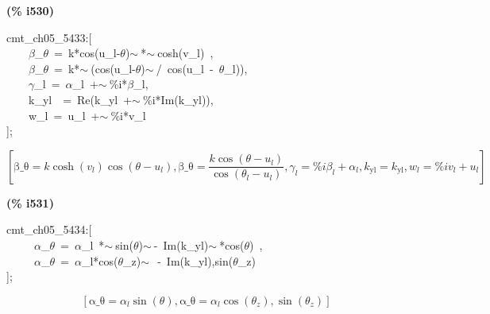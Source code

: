\documentclass[fleqn]{article}
\begin{document}
\noindent
\begin{minipage}[t]{4.000000em}\color{red}\bfseries
(\% i530)	
\end{minipage}
\begin{minipage}[t]{\textwidth}\color{blue}
cmt\_ch05\_5433:[\\
\ \ \ \ \ensuremath{\beta}\_\ensuremath{\theta}\ =\ k*cos(u\_l-\ensuremath{\theta})\ensuremath{\sim\ }*\ensuremath{\sim\ }cosh(v\_l)\ ,\ \\
\ \ \ \ \ensuremath{\beta}\_\ensuremath{\theta}\ =\ k*\ensuremath{\sim\ }(cos(u\_l-\ensuremath{\theta})\ensuremath{\sim\ }/\ cos(u\_l\ -\ \ensuremath{\theta}\_l)),\\
\ \ \ \ \ensuremath{\gamma}\_l\ =\ \ensuremath{\alpha}\_l\ +\ensuremath{\sim\ }\%i*\ensuremath{\beta}\_l,\\
\ \ \ \ k\_yl\ \ =\ Re(k\_yl\ +\ensuremath{\sim\ }\%i*Im(k\_yl)),\\
\ \ \ \ w\_l\ =\ u\_l\ +\ensuremath{\sim\ }\%i*v\_l\\
];
\end{minipage}
\[\displaystyle \tag{\% o530} 
\operatorname{[}\ensuremath{\mathrm{\beta \_ \theta }}=k \cosh{\left( {v_l}\right) } \cos{\left( \theta -{u_l}\right) }\operatorname{,}\ensuremath{\mathrm{\beta \_ \theta }}=\frac{k \cos{\left( \theta -{u_l}\right) }}{\cos{\left( {{\theta }_l}-{u_l}\right) }}\operatorname{,}{{\gamma }_l}=\% i {{\beta }_l}+{{\alpha }_l}\operatorname{,}{k_{\ensuremath{\mathrm{yl}}}}={k_{\ensuremath{\mathrm{yl}}}}\operatorname{,}{w_l}=\% i {v_l}+{u_l}\operatorname{]}\mbox{}
\]


\noindent
\begin{minipage}[t]{4.000000em}\color{red}\bfseries
(\% i531)	
\end{minipage}
\begin{minipage}[t]{\textwidth}\color{blue}
cmt\_ch05\_5434:[\\
\ \ \ \ \ \ensuremath{\alpha}\_\ensuremath{\theta}\ =\ \ensuremath{\alpha}\_l\ *\ensuremath{\sim\ }sin(\ensuremath{\theta})\ensuremath{\sim\ }-\ Im(k\_yl)\ensuremath{\sim\ }*cos(\ensuremath{\theta})\ ,\\
\ \ \ \ \ \ensuremath{\alpha}\_\ensuremath{\theta}\ =\ \ensuremath{\alpha}\_l*cos(\ensuremath{\theta}\_z)\ensuremath{\sim\ }\ -\ Im(k\_yl),sin(\ensuremath{\theta}\_z)\\
];
\end{minipage}
\[\displaystyle \tag{\% o531} 
\left[ \ensuremath{\mathrm{\alpha \_ \theta }}={{\alpha }_l} \sin{\left( \theta \right) }\operatorname{,}\ensuremath{\mathrm{\alpha \_ \theta }}={{\alpha }_l} \cos{\left( {{\theta }_z}\right) }\operatorname{,}\sin{\left( {{\theta }_z}\right) }\right] \mbox{}
\]
\end{document}
